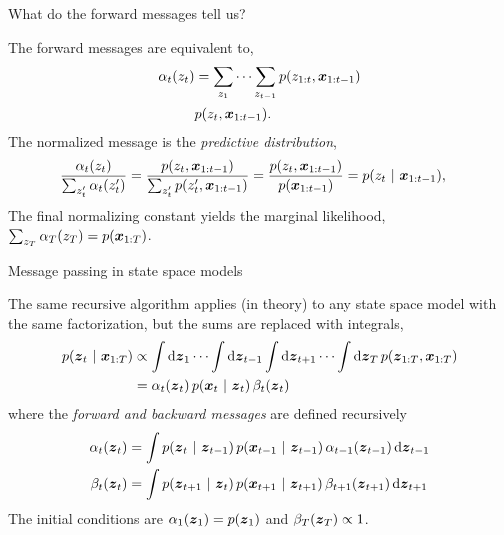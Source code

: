 \documentclass[aspectratio=169]{beamer}
\begin{document}
\begin{frame}{What do the forward messages tell us?}
    \label{slide:fwd_hmm}
    
    The forward messages are equivalent to,
    \begin{align}
        \alpha_t(z_t) &= \sum_{z_1} \cdots \sum_{z_{t-1}} p(z_{1:t}, \boldsymbol{x}_{1:t-1}) \\
        &p(z_t, \boldsymbol{x}_{1:t-1}).
    \end{align}
    The normalized message is the \textit{predictive distribution},
    \begin{align}
        \frac{\alpha_t(z_t)}{\sum_{z_t'} \alpha_t(z_t')} &= 
        \frac{p(z_t, \boldsymbol{x}_{1:t-1})}{\sum_{z_t'} p(z_t', \boldsymbol{x}_{1:t-1})} = \frac{p(z_t, \boldsymbol{x}_{1:t-1})}{p(\boldsymbol{x}_{1:t-1})} = p(z_t ~\vert~ \boldsymbol{x}_{1:t-1}),
    \end{align}
    The final normalizing constant yields the marginal likelihood, $\sum_{z_T} \alpha_T(z_T) = p(\boldsymbol{x}_{1:T})$.
    
    
\end{frame}
    
\begin{frame}{Message passing in state space models}
    
    The same recursive algorithm applies (in theory) to any state space model with the same factorization, but the sums are replaced with integrals,
    \begin{align}
        p(\boldsymbol{z}_t ~\vert~ \boldsymbol{x}_{1:T}) &\propto \int \mathop{}\!\mathrm{d} \boldsymbol{z}_1 \cdots \int \mathop{}\!\mathrm{d} {\boldsymbol{z}_{t-1}} \int \mathop{}\!\mathrm{d}{\boldsymbol{z}_{t+1}} \cdots \int \mathop{}\!\mathrm{d} {\boldsymbol{z}_T} \,  p(\boldsymbol{z}_{1:T}, \boldsymbol{x}_{1:T}) \\
        &= \alpha_t(\boldsymbol{z}_t) \, p(\boldsymbol{x}_t ~\vert~ \boldsymbol{z}_t) \, \beta_t(\boldsymbol{z}_t) 
    \end{align}
    where the \textit{forward and backward messages} are defined recursively
    \begin{align}
        \alpha_t(\boldsymbol{z}_t) &= \int p(\boldsymbol{z}_t ~\vert~ \boldsymbol{z}_{t-1}) \, p(\boldsymbol{x}_{t-1} ~\vert~ \boldsymbol{z}_{t-1}) \, \alpha_{t-1}(\boldsymbol{z}_{t-1}) \mathop{}\!\mathrm{d} {\boldsymbol{z}_{t-1}} \\
        \beta_t(\boldsymbol{z}_t) &= \int p(\boldsymbol{z}_{t+1} ~\vert~ \boldsymbol{z}_t) \, p(\boldsymbol{x}_{t+1} ~\vert~ \boldsymbol{z}_{t+1}) \, \beta_{t+1}(\boldsymbol{z}_{t+1}) \mathop{}\!\mathrm{d} {\boldsymbol{z}_{t+1}} 
    \end{align}
    The initial conditions are $\alpha_1(\boldsymbol{z}_1) = p(\boldsymbol{z}_1)$ and $\beta_{T}(\boldsymbol{z}_T) \propto 1$.
        
\end{frame}
    
\end{document}
